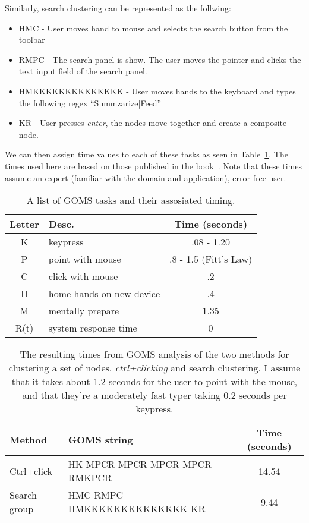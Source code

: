 Similarly, search clustering can be represented as the follwing: 

\begin{itemize}
\item HMC - User moves hand to mouse and selects the search button from the toolbar
\item RMPC - The search panel is show. The user moves the pointer and clicks the text input field of the search panel.
\item HMKKKKKKKKKKKKKK - User moves hands to the keyboard and types the following regex ``Summzarize|Feed''
\item KR - User presses \textit{enter}, the nodes move together and create a composite node.
\end{itemize}

We can then assign time values to each of these tasks as seen in Table~\ref{tab:goms-times}. The times used here are based on those published in the  book~\cite{card1983psychology}. Note that these times assume an expert (familiar with the domain and application), error free user.

\begin{table}[h]
	\centering
		\def\arraystretch{1.5}
	\caption{A list of GOMS tasks and their assosiated timing.}
	\label{tab:goms-times}
	\begin{tabular}{| c | l | c |}
		\hline
		\textbf{Letter} & \textbf{Desc.} & \textbf{Time (seconds)} \\
		\hline
		\hline
		K & keypress & .08 - 1.20 \\
		P & point with mouse & .8 - 1.5 (Fitt's Law) \\
		C & click with mouse & .2 \\
		H & home hands on new device & .4 \\
		M & mentally prepare & 1.35 \\
		R(t) & system response time & 0 \\
		\hline
	\end{tabular}
\end{table}

\begin{table}[h]
	\centering
		\def\arraystretch{1.5}
	\caption{The resulting times from GOMS analysis of the two methods for clustering a set of nodes, \textit{ctrl+clicking} and search clustering. I assume that it takes about 1.2 seconds for the user to point with the mouse, and that they're a moderately fast typer taking 0.2 seconds per keypress.}
	\label{tab:goms-results}
	\begin{tabular}{| l | l | c |}
		\hline
		\textbf{Method} & \textbf{GOMS string} & \textbf{Time (seconds)} \\
		\hline
		\hline
		Ctrl+click & HK MPCR MPCR MPCR MPCR RMKPCR & 14.54 \\
		Search group & HMC RMPC HMKKKKKKKKKKKKKK KR & 9.44 \\
		\hline
	\end{tabular}
\end{table}

